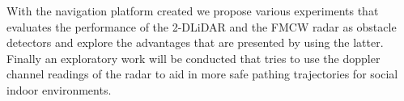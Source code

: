         \TEXT{}     
       {With the navigation platform created we propose various experiments that evaluates the performance of the   2-D\ac{LiDAR} and the \ac{FMCW} radar as obstacle detectors and explore the advantages that are presented by using the latter. Finally an exploratory work will be conducted that tries to use the doppler channel readings of the \ac{radar} to aid in more safe pathing trajectories for social indoor environments.
        }
\EndTitlePage
\titlepage\ \endtitlepage %